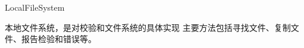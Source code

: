\begin{XeClass}{LocalFileSystem}
   
 本地文件系统，是对校验和文件系统的具体实现
 主要方法包括寻找文件、复制文件、报告检验和错误等。

\end{XeClass}
